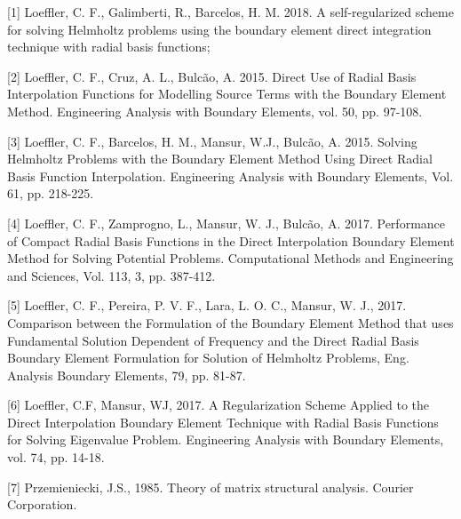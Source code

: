 \documentclass[a4paper,12p]{article}
\begin{document}
	[1] Loeffler, C. F., Galimberti, R., Barcelos, H. M. 2018. A self-regularized scheme for solving Helmholtz problems using the boundary element direct integration technique with radial basis functions;
	
	
	[2] Loeffler, C. F., Cruz, A. L., Bulcão, A. 2015. Direct Use of Radial Basis Interpolation Functions for Modelling Source Terms with the Boundary Element Method. Engineering Analysis with Boundary Elements, vol. 50, pp. 97-108. 


	[3] Loeffler, C. F., Barcelos, H. M., Mansur, W.J., Bulcão, A. 2015. Solving Helmholtz Problems with the Boundary Element Method Using Direct Radial Basis Function Interpolation. Engineering Analysis with Boundary Elements, Vol. 61, pp. 218-225.
	
	
	[4] Loeffler, C. F., Zamprogno, L., Mansur, W. J., Bulcão, A. 2017. Performance of Compact Radial Basis Functions in the Direct Interpolation Boundary Element Method for Solving Potential Problems. Computational Methods and Engineering and Sciences, Vol. 113, 3, pp. 387-412.
	
	
	[5] Loeffler, C. F., Pereira, P. V. F., Lara, L. O. C., Mansur, W. J., 2017. Comparison between the Formulation of the Boundary Element Method that uses Fundamental Solution Dependent of Frequency and the Direct Radial Basis Boundary Element Formulation for Solution of Helmholtz Problems, Eng. Analysis Boundary Elements, 79, pp. 81-87.
	
	
	[6] Loeffler, C.F, Mansur, WJ, 2017. A Regularization Scheme Applied to the Direct Interpolation Boundary Element Technique with Radial Basis Functions for Solving Eigenvalue Problem. Engineering Analysis with Boundary Elements, vol. 74, pp. 14-18.
	
	[7] Przemieniecki, J.S., 1985. Theory of matrix structural analysis. Courier Corporation.
	
\end{document}
